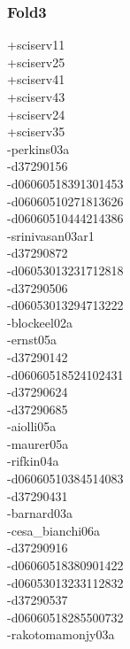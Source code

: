 \begin{multicols}{4}
\subsubsection*{Fold3}
+sciserv11\\
+sciserv25\\
+sciserv41\\
+sciserv43\\
+sciserv24\\
+sciserv35\\
-perkins03a\\
-d37290156\\
-d06060518391301453\\
-d06060510271813626\\
-d06060510444214386\\
-srinivasan03ar1\\
-d37290872\\
-d06053013231712818\\
-d37290506\\
-d06053013294713222\\
-blockeel02a\\
-ernst05a\\
-d37290142\\
-d06060518524102431\\
-d37290624\\
-d37290685\\
-aiolli05a\\
-maurer05a\\
-rifkin04a\\
-d06060510384514083\\
-d37290431\\
-barnard03a\\
-cesa\_bianchi06a\\
-d37290916\\
-d06060518380901422\\
-d06053013233112832\\
-d37290537\\
-d06060518285500732\\
-rakotomamonjy03a\\

\end{multicols}

